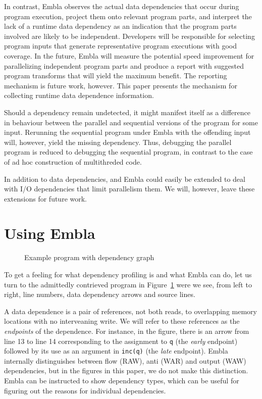 \documentclass{acm_proc_article-sp}
\begin{document}
In contrast, Embla
observes the actual data dependencies that occur during program
execution, project them onto relevant program parts, and interpret the
lack of a runtime data dependency as an indication that the program
parts involved are likely to be independent.
Developers will be responsible for selecting
program inputs that generate representative program executions with
good coverage.  In the future, Embla will measure the potential speed
improvement for parallelizing independent program parts and produce a
report with suggested program transforms that will yield the maximum
benefit.  The reporting mechanism is future work, however.  This paper
presents the mechanism for collecting runtime data dependence information.

Should a dependency remain undetected, it might manifest itself as a 
difference in behaviour between the parallel and sequential versions of the
program for some input. Rerunning the sequential program under
Embla with the offending input will, however, yield the missing dependency.
Thus, debugging the parallel program is reduced to debugging the sequential 
program, in contrast to the case of ad hoc construction of multithreded
code.

In addition to data dependencies, and Embla could easily be extended to
deal with I/O dependencies that limit parallelism them. We will, however,
leave these extensions for future work.



\section{Using Embla}

\begin{figure} 
\small

\caption{Example program with dependency graph} \label{ffirstex}
\end{figure}

To get a feeling for what dependency profiling is and what Embla can do, 
let us turn to the admittedly contrieved program in Figure~\ref{ffirstex}
were we see, from left to right, line numbers, data dependency 
arrows and source lines. 

A data dependence is a pair
of references, not both reads, to overlapping memory
locations with no interveaning write. We will refer to these
references as the {\em endpoints} of the dependence.
For instance, in the figure, 
there is an arrow from line 13 to line 14 corresponding to
the assignment to {\tt q} (the {\em early} endpoint) followed by its use 
as an argument in {\tt inc(q)} (the {\em late} endpoint). Embla
internally distinguishes between flow (RAW), anti (WAR) and output (WAW) 
dependencies, but in the figures in this paper, we do not make this
distinction. Embla can be instructed to show dependency types, which can be
useful for figuring out the reasons for individual dependencies.
\end{document}
